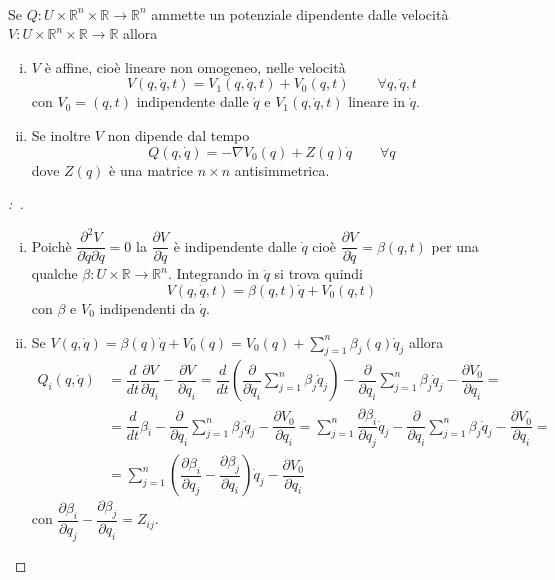 \documentclass[11pt,a4paper,twoside]{book}
\newenvironment{proposizione}[1][\empty]{\begin{Proposizione}{
\ifx\empty#1\relax\else\mdseries\itshape#1\\\fi
}{}}{\end{Proposizione}}
\newenvironment{dimo}[1][\proofname]{
	\begin{tcolorbox}[
	breakable, 
	enhanced, 
	interior hidden, 
	frame hidden, 
	borderline west = {1pt}{0pt}{gray}, 
	top=0pt, bottom=0pt, left=0pt]
\begin{proof}[#1:~]
}
{
\end{proof}
\end{tcolorbox}
}
\theoremstyle{esss}
\theoremstyle{dotless}
\numberwithin{equation}{section} %
\begin{document}
\begin{proposizione}
Se $Q:U\times\mathbb{R}^n\times\mathbb{R}\rightarrow\mathbb{R}^n$ ammette un potenziale dipendente dalle velocità $V:U\times\mathbb{R}^n\times\mathbb{R}\rightarrow\mathbb{R}$ allora \begin{enumerate}[i.]
\item $V$ è affine, cioè lineare non omogeneo, nelle velocità
\[
V(q,\dot{q},t)=V_1(q,\dot{q},t)+V_0(q,t) \qquad \forall q,\dot{q},t
\]
con $V_0=(q,t)$ indipendente dalle $\dot{q}$ e $V_1(q,\dot{q},t)$ lineare in $\dot{q}$.
\item Se inoltre $V$ non dipende dal tempo
\[
Q(q,\dot{q})=-\nabla V_0(q) + Z(q)\dot{q} \qquad \forall q
\]
dove $Z(q)$ è una matrice $n\times n$ antisimmetrica.

\end{enumerate}
\end{proposizione}
\begin{dimo}~\begin{enumerate}[i.]
\item Poichè $\dfrac{\partial^2 V}{\partial \dot{q}\partial\dot{q}}=0$ la $\dfrac{\partial V}{\partial \dot{q}}$ è indipendente dalle $\dot{q}$ cioè $\dfrac{\partial V}{\partial \dot{q}}=\beta(q,t)$ per una qualche $\beta:U\times\mathbb{R}\rightarrow\mathbb{R}^n$.
Integrando in $\dot{q}$ si trova quindi
\[
V(q,\dot{q},t)=\beta(q,t)\dot{q}+ V_0(q,t)
\]
con $\beta$ e $V_0$ indipendenti da $\dot{q}$.
\item Se $V(q,\dot{q})=\beta(q)\dot{q}+ V_0(q)=V_0(q) + \sum_{j=1}^n \beta_j(q)\dot{q}_j $ allora 
\begin{align*}
Q_i (q,\dot{q}) & = \dfrac{d}{dt}\dfrac{\partial V}{\partial \dot{q}_i} - \dfrac{\partial V}{\partial q_i}
=\dfrac{d}{dt} \left(\dfrac{\partial}{\partial\dot{q}_i}\sum_{j=1}^n \beta_j\dot{q}_j \right) - \dfrac{\partial}{\partial q_i}\sum_{j=1}^n\beta_j\dot{q}_j -\dfrac{\partial V_0}{\partial q_i} =\\
& = \dfrac{d}{dt} \beta_i - \dfrac{\partial}{\partial q_i}\sum_{j=1}^n\beta_j\dot{q}_j -\dfrac{\partial V_0}{\partial q_i} 
= \sum_{j=1}^n \dfrac{\partial \beta_i}{\partial q_j} \dot{q}_j - \dfrac{\partial}{\partial q_i}\sum_{j=1}^n\beta_j\dot{q}_j -\dfrac{\partial V_0}{\partial q_i} = \\
&= \sum_{j=1}^n \left( \dfrac{\partial \beta_i}{\partial q_j} - \dfrac{\partial\beta_j}{\partial q_i}\right)\dot{q}_j -\dfrac{\partial V_0}{\partial q_i}
\end{align*}
con $\dfrac{\partial \beta_i}{\partial q_j}-\dfrac{\partial \beta_j}{\partial q_i}=Z_{ij}$. \qedhere
\end{enumerate}
\end{dimo}
\end{document}

